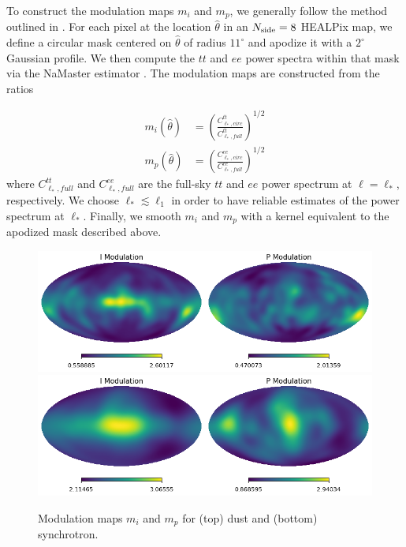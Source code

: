 \documentclass[twocolumn]{aastex631}
\begin{document}

To construct the modulation maps $m_i$ and $m_p$, we generally follow the method outlined in \citet{Thorne:2017}. For each pixel at the location $\hat{\theta}$ in an $N_{\rm side} = 8$ HEALPix map, we define a circular mask centered on $\hat{\theta}$ of radius $11^\circ$  and apodize it with a $2^\circ$ Gaussian profile. We then compute the $tt$ and $ee$ power spectra within that mask via the NaMaster estimator \citep{Alonso:2019}. The modulation maps are constructed from the ratios 

\begin{align}
    m_i\left(\hat{\theta} \right) &= \left(\frac{C^{tt}_{\ell_*,circ}}{C^{tt}_{\ell_*,full}}\right)^{1/2} \\
    m_p\left(\hat{\theta}\right) &= \left(\frac{C^{ee}_{\ell_*,circ}}{C^{ee}_{\ell_*,full}}\right)^{1/2}
\end{align}
where $C^{tt}_{\ell_*,full}$ and $C^{ee}_{\ell_*,full}$ are the full-sky $tt$ and $ee$ power spectrum at $\ell = \ell_*$, respectively. We choose $\ell_* \lesssim \ell_1$ in order to have reliable estimates of the power spectrum at $\ell_*$. Finally, we smooth $m_i$ and $m_p$ with a kernel equivalent to the apodized mask described above. 
 
 \begin{figure}
     \centering
     \includegraphics[width=2\columnwidth]{figures/mod_dust.png}\\
      \includegraphics[width=2\columnwidth]{figures/mod_synch.png}\\
     \caption{Modulation maps $m_i$ and $m_p$ for (top) dust and  (bottom) synchrotron. }
     \label{fig:modulation_maps}
 \end{figure}
 
\end{document}

